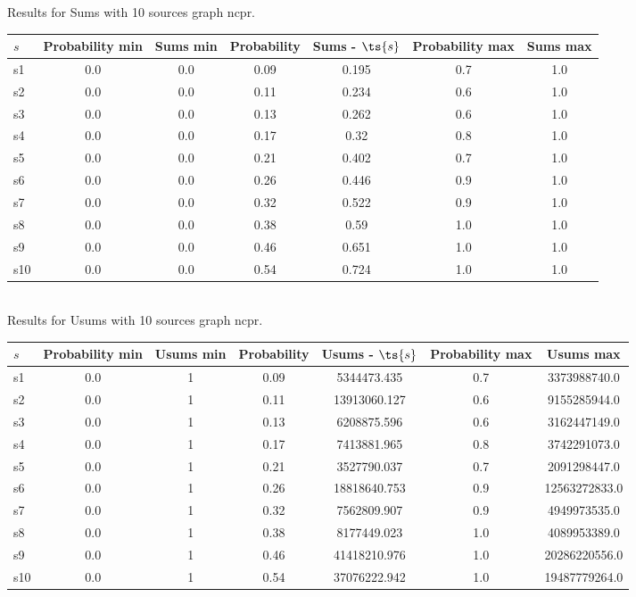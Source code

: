 \documentclass{article}
\begin{document}
\noindent Results for Sums with 10 sources graph ncpr.

\noindent\begin{tabular}{|l|c|c|c|c|c|c|}
\hline
$s$& Probability min & Sums min & Probability & Sums - $\ts{s}$ & Probability max & Sums max\\
\hline
s1 &0.0 & 0.0 & 0.09 & 0.195 & 0.7 & 1.0\\
\hline
s2 &0.0 & 0.0 & 0.11 & 0.234 & 0.6 & 1.0\\
\hline
s3 &0.0 & 0.0 & 0.13 & 0.262 & 0.6 & 1.0\\
\hline
s4 &0.0 & 0.0 & 0.17 & 0.32 & 0.8 & 1.0\\
\hline
s5 &0.0 & 0.0 & 0.21 & 0.402 & 0.7 & 1.0\\
\hline
s6 &0.0 & 0.0 & 0.26 & 0.446 & 0.9 & 1.0\\
\hline
s7 &0.0 & 0.0 & 0.32 & 0.522 & 0.9 & 1.0\\
\hline
s8 &0.0 & 0.0 & 0.38 & 0.59 & 1.0 & 1.0\\
\hline
s9 &0.0 & 0.0 & 0.46 & 0.651 & 1.0 & 1.0\\
\hline
s10 &0.0 & 0.0 & 0.54 & 0.724 & 1.0 & 1.0\\
\hline
\end{tabular}\\

\noindent Results for Usums with 10 sources graph ncpr.

\noindent\begin{tabular}{|l|c|c|c|c|c|c|}
\hline
$s$& Probability min & Usums min & Probability & Usums - $\ts{s}$ & Probability max & Usums max\\
\hline
s1 &0.0 & 1 & 0.09 & 5344473.435 & 0.7 & 3373988740.0\\
\hline
s2 &0.0 & 1 & 0.11 & 13913060.127 & 0.6 & 9155285944.0\\
\hline
s3 &0.0 & 1 & 0.13 & 6208875.596 & 0.6 & 3162447149.0\\
\hline
s4 &0.0 & 1 & 0.17 & 7413881.965 & 0.8 & 3742291073.0\\
\hline
s5 &0.0 & 1 & 0.21 & 3527790.037 & 0.7 & 2091298447.0\\
\hline
s6 &0.0 & 1 & 0.26 & 18818640.753 & 0.9 & 12563272833.0\\
\hline
s7 &0.0 & 1 & 0.32 & 7562809.907 & 0.9 & 4949973535.0\\
\hline
s8 &0.0 & 1 & 0.38 & 8177449.023 & 1.0 & 4089953389.0\\
\hline
s9 &0.0 & 1 & 0.46 & 41418210.976 & 1.0 & 20286220556.0\\
\hline
s10 &0.0 & 1 & 0.54 & 37076222.942 & 1.0 & 19487779264.0\\
\hline
\end{tabular}\\
\end{document}
